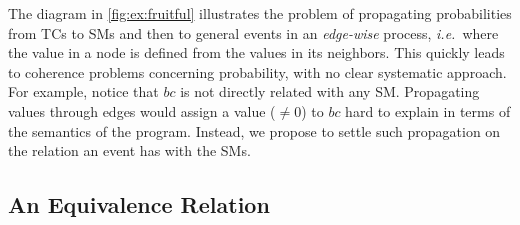 \documentclass[x11names]{tlp}
\begin{document}
The diagram in \cref{fig:ex:fruitful} illustrates the problem of propagating
probabilities from \aclp{TC} to \aclp{SM} and then to general events in an
\emph{edge-wise} process, \emph{i.e.}~where the value in a node is defined
from the values in its neighbors. This quickly leads to coherence problems
concerning probability, with no clear systematic approach. For example,
notice that $bc$ is not directly related with any \acl{SM}. Propagating
values through edges would assign a value ($\not= 0$) to $bc$ hard to explain
in terms of the semantics of the program. Instead, we propose to settle such
propagation on the relation an event has with the \aclp{SM}.

\subsection{An Equivalence Relation}
\label{subsec:equivalence.relation}
\end{document}
